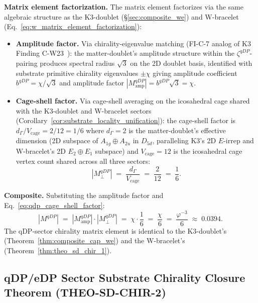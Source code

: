 \documentclass[11pt,letterpaper]{article}
\newcommand{\phig}{\varphi}
\begin{document}
\textbf{Matrix element factorization.} The matrix element factorizes via the same algebraic structure as the K3-doublet (\S\ref{sec:composite_we}) and W-bracelet (Eq.~\eqref{eq:w_matrix_element_factorization}):
\begin{itemize}\setlength\itemsep{0.2em}
    \item \textbf{Amplitude factor.} Via chirality-eigenvalue matching (FI-C-7 analog of K3 Finding C-W23~\cite{abshier_capotauro_subclaim_c_sketch}): the matter-doublet's amplitude structure within the $\zeta^{qDP}$-pairing produces spectral radius $\sqrt{3}$ on the 2D doublet basis, identified with substrate primitive chirality eigenvalues $\pm \chi$ giving amplitude coefficient $b^{qDP} = \chi/\sqrt{3}$ and amplitude factor $|M_{\text{amp}}^{qDP}| = b^{qDP}\sqrt{3} = \chi$.
    \item \textbf{Cage-shell factor.} Via cage-shell averaging on the icosahedral cage shared with the K3-doublet and W-bracelet sectors (Corollary~\ref{cor:substrate_locality_unification}): the cage-shell factor is $d_\Gamma/V_{\text{cage}} = 2/12 = 1/6$ where $d_\Gamma = 2$ is the matter-doublet's effective dimension (2D subspace of $A_{1g} \oplus A_{2u}$ in $D_{5d}$, paralleling K3's 2D $E$-irrep and W-bracelet's 2D $E_2 \oplus E_1$ subspace) and $V_{\text{cage}} = 12$ is the icosahedral cage vertex count shared across all three sectors:
    \begin{equation}\label{eq:qdp_cage_shell_factor}
    |M_\perp^{qDP}| \;=\; \frac{d_\Gamma}{V_{\text{cage}}} \;=\; \frac{2}{12} \;=\; \frac{1}{6}.
    \end{equation}
\end{itemize}

\textbf{Composite.} Substituting the amplitude factor and Eq.~\eqref{eq:qdp_cage_shell_factor}:
\begin{equation}\label{eq:qdp_composite_result}
|M^{qDP}| \;=\; |M_{\text{amp}}^{qDP}| \cdot |M_\perp^{qDP}| \;=\; \chi \cdot \frac{1}{6} \;=\; \frac{\chi}{6} \;=\; \frac{\phig^{-3}}{6} \;\approx\; 0.0394.
\end{equation}
The qDP-sector chirality matrix element is identical to the K3-doublet's (Theorem~\ref{thm:composite_cap_we}) and the W-bracelet's (Theorem~\ref{thm:theo_sd_chir_1}).

\subsection{qDP/eDP Sector Substrate Chirality Closure Theorem (THEO-SD-CHIR-2)}\label{sec:theo_sd_chir_2_statement}
\end{document}
